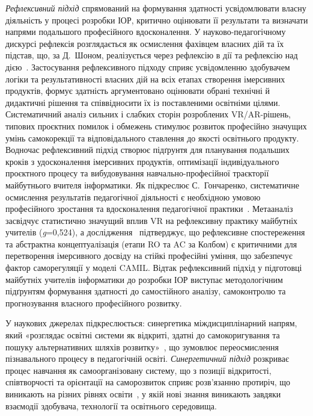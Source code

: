 \emph{Рефлексивний підхід} спрямований на формування здатності усвідомлювати власну діяльність у процесі розробки ІОР, критично оцінювати її результати та визначати напрями подальшого професійного вдосконалення. У науково-педагогічному дискурсі рефлексія розглядається як осмислення фахівцем власних дій та їх підстав, що, за Д.~Шоном, реалізується через рефлексію в дії та рефлексію над дією~\cite{ReflexiveApproach2018}. Застосування рефлексивного підходу сприяє усвідомленню здобувачем логіки та результативності власних дій на всіх етапах створення імерсивних продуктів, формує здатність аргументовано оцінювати обрані технічні й дидактичні рішення та співвідносити їх із поставленими освітніми цілями. Систематичний аналіз сильних і слабких сторін розроблених VR/AR-рішень, типових проєктних помилок і обмежень стимулює розвиток професійно значущих умінь самокорекції та відповідального ставлення до якості освітнього продукту. Водночас рефлексивний підхід створює підґрунтя для планування подальших кроків з удосконалення імерсивних продуктів, оптимізації індивідуального проєктного процесу та вибудовування навчально-професійної траєкторії майбутнього вчителя інформатики. Як підкреслює С.~Гончаренко, систематичне осмислення результатів педагогічної діяльності є необхідною умовою професійного зростання та вдосконалення педагогічної практики~\cite{Goncharenko2011Pedagogy}. Метааналіз~\cite{Han2025VRTeacherEd} засвідчує статистично значущий вплив VR на рефлексивну практику майбутніх учителів (\textit{g}=0,524), а дослідження~\cite{Kee2023Experiential} підтверджує, що рефлексивне спостереження та абстрактна концептуалізація (етапи RO та AC за Колбом) є критичними для перетворення імерсивного досвіду на стійкі професійні уміння, що забезпечує фактор саморегуляції у моделі CAMIL. Відтак рефлексивний підхід у підготовці майбутніх учителів інформатики до розробки ІОР виступає методологічним підґрунтям формування здатності до самостійного аналізу, самоконтролю та прогнозування власного професійного розвитку.

У наукових джерелах підкреслюється: синергетика міждисциплінарний напрям, який «розглядає освітні системи як відкриті, здатні до самокоригування та пошуку альтернативних шляхів розвитку»~\cite[c.~49]{Kuzminskyi2012Pedagogy}, що зумовлює переосмислення пізнавального процесу в педагогічній освіті. \emph{Синергетичний підхід} розкриває процес навчання як самоорганізовану систему, що з позиції відкритості, співтворчості та орієнтації на саморозвиток сприяє розв'язанню протиріч, що виникають на різних рівнях освіти~\cite{Kuzminskyi2012Pedagogy}, у якій нові знання виникають завдяки взаємодії здобувача, технології та освітнього середовища.


